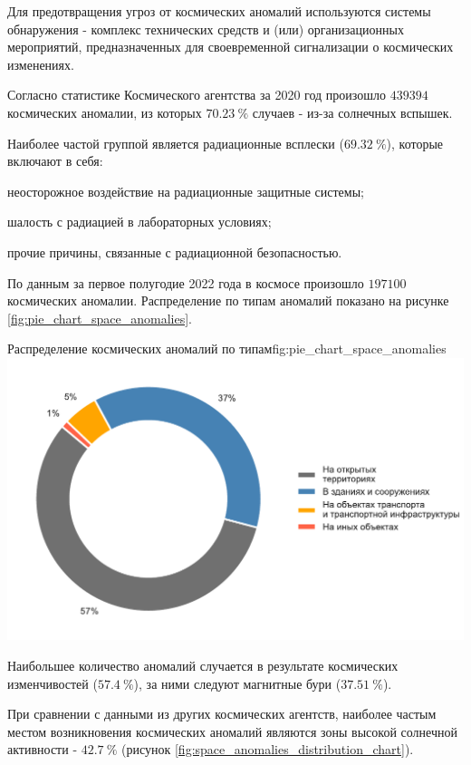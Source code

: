 \documentclass[]{../vvsu}
\begin{document}
Для предотвращения угроз от космических аномалий используются системы обнаружения - комплекс технических средств и (или) организационных мероприятий, предназначенных для своевременной сигнализации о космических изменениях.

Согласно статистике Космического агентства за 2020 год \cite{Space_Data_2020} произошло $\num{439394}$ космических аномалии, из которых $\qty{70.23}{\percent}$ случаев - из-за солнечных вспышек.

Наиболее частой группой является радиационные всплески ($\qty{69.32}{\percent}$), которые включают в себя:
\begin{vvsu_list}
  \item неосторожное воздействие на радиационные защитные системы;
  \item шалость с радиацией в лабораторных условиях;
  \item прочие причины, связанные с радиационной безопасностью.
\end{vvsu_list}

По данным за первое полугодие 2022 года в космосе произошло $\num{197100}$ космических аномалии. Распределение по типам аномалий показано на рисунке \ref{fig:pie_chart_space_anomalies}.

\begin{vvsu_figure}{Распределение космических аномалий по типам}{fig:pie_chart_space_anomalies}
  \includegraphics[width=0.9\linewidth]{stats_fire_by_object_groups.pdf}
\end{vvsu_figure}

Наибольшее количество аномалий случается в результате космических изменчивостей ($\qty{57.4}{\percent}$), за ними следуют магнитные бури ($\qty{37.51}{\percent}$).

При сравнении с данными из других космических агентств, наиболее частым местом возникновения космических аномалий являются зоны высокой солнечной активности - $\qty{42.7}{\percent}$ (рисунок \ref{fig:space_anomalies_distribution_chart}).
\end{document}
